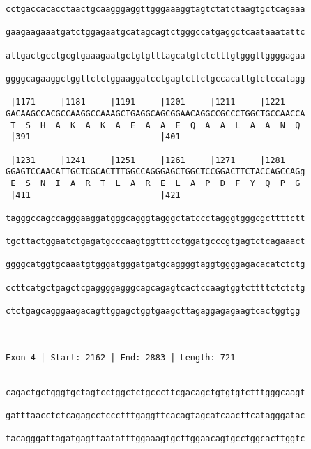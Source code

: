 \documentclass{article}
\begin{document}
\begin{Verbatim}
cctgaccacacctaactgcaagggaggttgggaaaggtagtctatctaagtgctcagaaa
                                                            
gaagaagaaatgatctggagaatgcatagcagtctgggccatgaggctcaataaatattc
                                                            
attgactgcctgcgtgaaagaatgctgtgtttagcatgtctctttgtgggttggggagaa
                                                            
ggggcagaaggctggttctctggaaggatcctgagtcttctgccacattgtctccatagg
                                                            
 |1171     |1181     |1191     |1201     |1211     |1221    
GACAAGCCACGCCAAGGCCAAAGCTGAGGCAGCGGAACAGGCCGCCCTGGCTGCCAACCA
 T  S  H  A  K  A  K  A  E  A  A  E  Q  A  A  L  A  A  N  Q 
 |391                          |401                         
  
 |1231     |1241     |1251     |1261     |1271     |1281    
GGAGTCCAACATTGCTCGCACTTTGGCCAGGGAGCTGGCTCCGGACTTCTACCAGCCAGg
 E  S  N  I  A  R  T  L  A  R  E  L  A  P  D  F  Y  Q  P  G 
 |411                          |421                         
  
tagggccagccagggaaggatgggcagggtagggctatccctagggtgggcgcttttctt
                                                            
tgcttactggaatctgagatgcccaagtggtttcctggatgcccgtgagtctcagaaact
                                                            
ggggcatggtgcaaatgtgggatgggatgatgcaggggtaggtggggagacacatctctg
                                                            
ccttcatgctgagctcgaggggagggcagcagagtcactccaagtggtcttttctctctg
                                                            
ctctgagcagggaagacagttggagctggtgaagcttagaggagagaagtcactggtgg
                                                           
                                                           
 
Exon 4 | Start: 2162 | End: 2883 | Length: 721


cagactgctgggtgctagtcctggctctgcccttcgacagctgtgtgtctttgggcaagt
                                                            
gatttaacctctcagagcctccctttgaggttcacagtagcatcaacttcatagggatac
                                                            
tacagggattagatgagttaatatttggaaagtgcttggaacagtgcctggcacttggtc
                                                            

\end{Verbatim}
\end{document}
